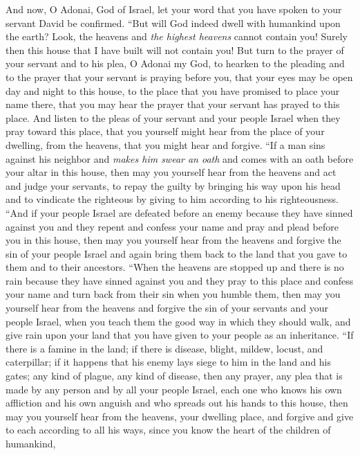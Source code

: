 \begin{biblechapter}
\verse And now, O Adonai, God of Israel, let your word that you have spoken to your servant David be confirmed.
\verse “But will God indeed dwell with humankind upon the earth? Look, the heavens and \textit{the highest heavens} cannot contain you! Surely then this house that I have built will not contain you!
\verse But turn to the prayer of your servant and to his plea, O Adonai my God, to hearken to the pleading and to the prayer that your servant is praying before you,
\verse that your eyes may be open day and night to this house, to the place that you have promised to place your name there, that you may hear the prayer that your servant has prayed to this place.
\verse And listen to the pleas of your servant and your people Israel when they pray toward this place, that you yourself might hear from the place of your dwelling, from the heavens, that you might hear and forgive.
\verse “If a man sins against his neighbor and \textit{makes him swear an oath} and comes with an oath before your altar in this house,
\verse then may you yourself hear from the heavens and act and judge your servants, to repay the guilty by bringing his way upon his head and to vindicate the righteous by giving to him according to his righteousness.
\verse “And if your people Israel are defeated before an enemy because they have sinned against you and they repent and confess your name and pray and plead before you in this house,
\verse then may you yourself hear from the heavens and forgive the sin of your people Israel and again bring them back to the land that you gave to them and to their ancestors.
\verse “When the heavens are stopped up and there is no rain because they have sinned against you and they pray to this place and confess your name and turn back from their sin when you humble them,
\verse then may you yourself hear from the heavens and forgive the sin of your servants and your people Israel, when you teach them the good way in which they should walk, and give rain upon your land that you have given to your people as an inheritance.
\verse “If there is a famine in the land; if there is disease, blight, mildew, locust, and caterpillar; if it happens that his enemy lays siege to him in the land and his gates; any kind of plague, any kind of disease,
\verse then any prayer, any plea that is made by any person and by all your people Israel, each one who knows his own affliction and his own anguish and who spreads out his hands to this house,
\verse then may you yourself hear from the heavens, your dwelling place, and forgive and give to each according to all his ways, since you know the heart of the children of humankind,

\end{biblechapter}
